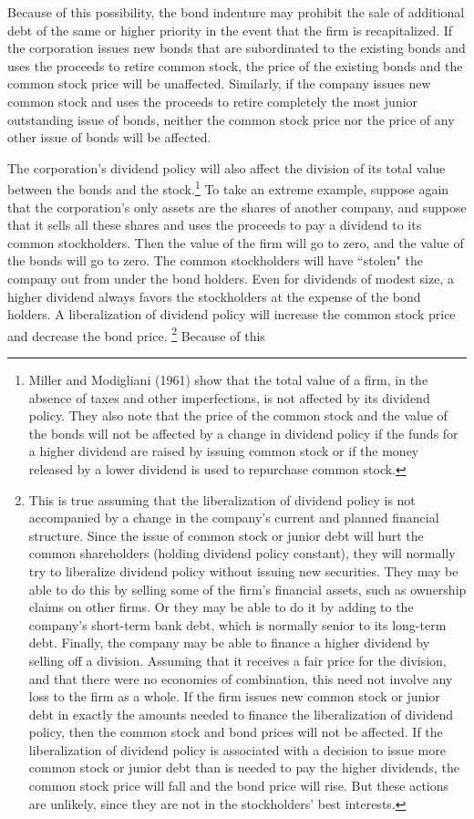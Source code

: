 \documentclass[a4paper, 12pt, twoside]{article}
\begin{document}
Because of this possibility, the bond indenture may prohibit the sale of additional 
debt of the same or higher priority in the event that the firm is recapitalized. If 
the corporation issues new bonds that are subordinated to the existing bonds and uses 
the proceeds to retire common stock, the price of the existing bonds and the common 
stock price will be unaffected. Similarly, if the company issues new common stock and 
uses the proceeds to retire completely the most junior outstanding issue of bonds, 
neither the common stock price nor the price of any other issue of bonds will be 
affected.

The corporation's dividend policy will also affect the division of its total value 
between the bonds and the stock.\footnote{\linespread{1.15}\fontsize{10}{10}\selectfont  
Miller and Modigliani (1961) show that the total value of a firm, in the 
absence of taxes and other imperfections, is not affected by its dividend policy. They 
also note that the price of the common stock and the value of the bonds will not be 
affected by a change in dividend policy if the funds for a higher dividend are raised 
by issuing common stock or if the money released by a lower dividend is used to 
repurchase common stock.} To take an extreme example, suppose again that the 
corporation's only assets are the shares of another company, and suppose that it sells 
all these shares and uses the proceeds to pay a dividend to its common stockholders. 
Then the value of the firm will go to zero, and the value of the bonds will go to 
zero. The common stockholders will have ``stolen" the company out from under the bond 
holders. Even for dividends of modest size, a higher dividend always favors the 
stockholders at the expense of the bond holders. A liberalization of dividend policy 
will increase the common stock price and decrease the bond price. \footnote{\linespread{1.15}\fontsize{10}{10}\selectfont  
This is true assuming that the liberalization of dividend policy is not 
accompanied by a change in the company's current and planned financial structure. 
Since the issue of common stock or junior debt will hurt the common shareholders 
(holding dividend policy constant), they will normally try to liberalize dividend 
policy without issuing new securities. They may be able to do this by selling some of 
the firm's financial assets, such as ownership claims on other firms. Or they may be 
able to do it by adding to the company's short-term bank debt, which is normally 
senior to its long-term debt. Finally, the company may be able to finance a higher 
dividend by selling off a division. Assuming that it receives a fair price for the 
division, and that there were no economies of combination, this need not involve any 
loss to the firm as a whole. If the firm issues new common stock or junior debt in 
exactly the amounts needed to finance the liberalization of dividend policy, then the 
common stock and bond prices will not be affected. If the liberalization of dividend 
policy is associated with a decision to issue more common stock or junior debt than is 
needed to pay the higher dividends, the common stock price will fall and the bond 
price will rise. But these actions are unlikely, since they are not in the 
stockholders' best interests.} Because of this 
\end{document}
